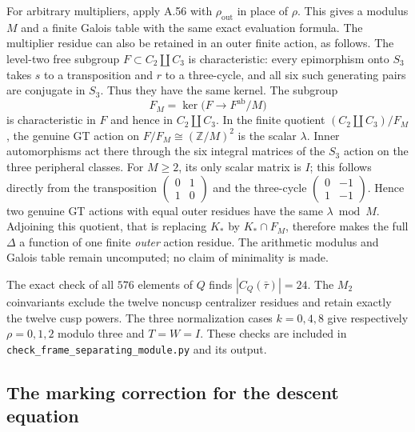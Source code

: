 For arbitrary multipliers, apply A.56 with $\rho_{\mathrm{out}}$
in place of $\rho$. This gives a modulus $M$ and a finite Galois table
with the same exact evaluation formula. The multiplier residue can
also be retained in an outer finite action, as follows. The level-two
free subgroup $F\subset C_2\amalg C_3$ is characteristic: every
epimorphism onto $S_3$ takes $s$ to a transposition and $r$ to a
three-cycle, and all six such generating pairs are conjugate in $S_3$.
Thus they have the same kernel. The subgroup
\[
 F_M=\ker\bigl(F\longrightarrow F^{\mathrm{ab}}/M\bigr)
\]
is characteristic in $F$ and hence in $C_2\amalg C_3$.
In the finite quotient $(C_2\amalg C_3)/F_M$, the genuine GT action
on $F/F_M\cong(\mathbb Z/M)^2$ is the scalar $\lambda$.
Inner automorphisms act there through the six integral matrices of
the $S_3$ action on the three peripheral classes. For $M\geq2$, its
only scalar matrix is $I$; this follows directly from the transposition
$\left(\begin{smallmatrix}0&1\\1&0\end{smallmatrix}\right)$ and
the three-cycle
$\left(\begin{smallmatrix}0&-1\\1&-1\end{smallmatrix}\right)$.
Hence two genuine GT actions with equal outer residues have the same
$\lambda\bmod M$.
Adjoining this quotient, that is replacing $K_*$ by $K_*\cap F_M$,
therefore makes the full $\Delta$ a function of one finite
\emph{outer} action residue. The arithmetic modulus and Galois table
remain uncomputed; no claim of minimality is made.

The exact check of all $576$ elements of $Q$ finds
$|C_Q(\bar\tau)|=24$. The $M_2$ coinvariants exclude the twelve
noncusp centralizer residues and retain exactly the twelve cusp powers.
The three normalization cases $k=0,4,8$ give respectively
$\rho=0,1,2$ modulo three and $T=W=I$.
These checks are included in
\texttt{check\_frame\_separating\_module.py} and its output.

\subsection{The marking correction for the descent equation}


